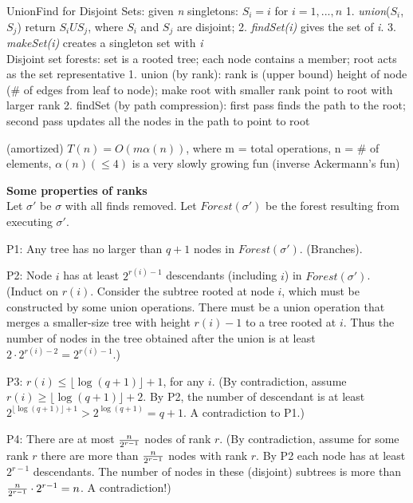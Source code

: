 UnionFind for Disjoint Sets: given \textit{n} singletons: 
$S_i = {i}$ for $i = 1, ..., n$
1. \textit{union}($S_i$, $S_j$) return $S_i U S_j$, where $S_i$ and $S_j$ are disjoint; 
2. \textit{findSet(i)} gives the set of \textit{i}.
3. \textit{makeSet(i)} creates a singleton set with \textit{i}
\\
%
Disjoint set forests: set is a rooted tree; each node contains a member; 
root acts as the set representative
1. union (by rank): rank is (upper bound) height of node 
(\# of edges from leaf to node); make root with smaller rank point to root with larger rank
2. findSet (by path compression): first pass finds the path to the root; 
second pass updates all the nodes in the path to point to root

(amortized) $T(n) = O(m\alpha(n))$, where m = total operations, n = \# of elements, 
$\alpha(n) (\le 4)$ is a very slowly growing fun (inverse Ackermann's fun)

\textbf{Some properties of ranks}\\
Let $\sigma'$ be $\sigma$ with all finds removed. Let $Forest(\sigma')$
be the forest resulting from executing $\sigma'$.

P1: Any tree has no larger than $q+1$ nodes in $Forest(\sigma')$. (Branches).

P2: Node $i$ has at least $2^{r(i)-1}$ descendants (including $i$)
in $Forest(\sigma')$. (Induct on $r(i)$. Consider the subtree rooted
at node $i$, which must be constructed by some union operations. There
must be a union operation that 
merges a smaller-size tree with height $r(i)-1$
to a tree rooted at $i$. Thus the number of nodes in the tree
obtained after the union is at least $2\cdot 2^{r(i)-2}=2^{r(i)-1}$.)

P3: $r(i)\le \lfloor\log (q+1)\rfloor+1$, for any $i$. 
(By contradiction, assume $r(i)\ge \lfloor\log (q+1)\rfloor+2$.
By P2, the number of descendant is at least $2^{\lfloor\log (q+1)\rfloor+1}
>2^{\log (q+1)}=q+1$. A contradiction to P1.)

P4: There are at most ${n\over 2^{r-1}}$ nodes of rank $r$. 
(By contradiction, assume for some rank $r$ there are more than 
${n\over 2^{r-1}}$ nodes with rank $r$. By P2 each node has at least $2^{r-1}$
descendants. The number of nodes in these (disjoint) subtrees is more than
${n\over 2^{r-1}}\cdot 2^{r-1}=n$. A contradiction!)

